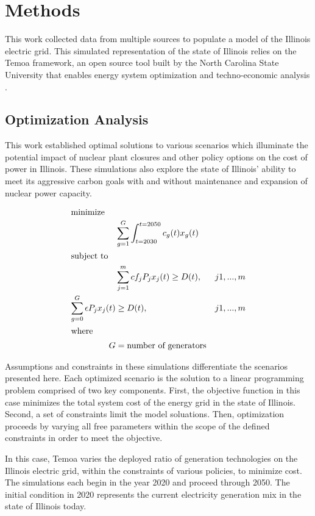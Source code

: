 \section{Methods}
This work collected data from multiple sources to populate a model of the 
Illinois electric grid. This simulated representation of the state of 
Illinois relies on the Temoa framework, an open source tool built by the North 
Carolina State University that enables energy system optimization and 
techno-economic analysis 
\cite{decarolis_temoa_2010,decarolis_modelling_2016,decarolis_formalizing_2017}.

\subsection{Optimization Analysis}
This work established optimal solutions to 
various scenarios which illuminate the potential impact of nuclear plant 
closures and other policy options on the cost of power in Illinois. These 
simulations  also explore the state of Illinois' ability to meet its aggressive 
carbon goals with and without maintenance and expansion of nuclear power 
capacity. 

\begin{align}
\intertext{minimize} 
&\sum_{g=1}^G\int_{t=2030}^{t=2050} c_g(t)x_g(t)\\
\intertext{subject to}
& \sum_{j=1}^m cf_j P_j x_j(t) \ge D(t),& j 1,...,m\\
\sum_{g=0}^G \epsilon P_j x_j(t) &\ge D(t),& j 1,...,m\\
\intertext{where}
G&=\text{number of generators}&\\
\end{align}


Assumptions and constraints in these simulations differentiate the scenarios 
presented here. Each optimized scenario is the solution to a linear programming 
problem  comprised of two key components. First, the objective function in this case 
minimizes the total system cost of the energy grid in the state of Illinois. 
Second, a set of constraints limit the model soluations. Then, optimization 
proceeds by varying all free parameters within the scope of the defined constraints in order to meet the objective.

In this case, Temoa varies the deployed ratio of generation technologies on the 
Illinois electric grid, within the constraints of various policies, to minimize 
cost. The simulations each begin in the year 2020 
and proceed through 2050. The initial condition in 2020 represents the current 
electricity generation mix in the state of Illinois today.

